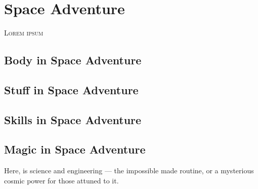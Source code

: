 \renewcommand{\realmaccent}{realmSpace}  %
\chapter{Space Adventure}

\begin{readaloud}
\lipsum[41][1-4]
\end{readaloud}


\lettrine{L}{orem ipsum} \lipsum[42]

\section{Body in Space Adventure}
\lipsum[43][1-4]

\section{Stuff in Space Adventure}
\lipsum[44][1-4]

\section{Skills in Space Adventure}
\lipsum[45][1-4]

\section{Magic in Space Adventure}
Here,  is science and engineering --- the impossible made
routine, or a mysterious cosmic power for those attuned to it.
\lipsum[46][1-3]

\begin{notebox}
\lipsum[47][1-3]
\end{notebox}

